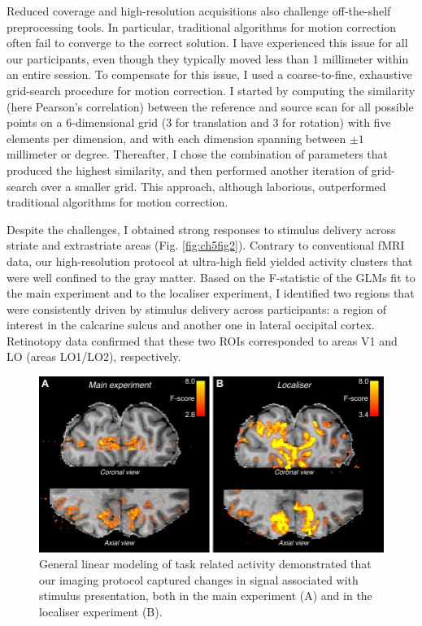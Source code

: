 Reduced coverage and high-resolution acquisitions also challenge off-the-shelf preprocessing tools. In particular, traditional algorithms for motion correction often fail to converge to the correct solution. I have experienced this issue for all our participants, even though they typically moved less than 1 millimeter within an entire session. To compensate for this issue, I used a coarse-to-fine, exhaustive grid-search procedure for motion correction. I started by computing the similarity (here Pearson's correlation) between the reference and source scan for all possible points on a 6-dimensional grid (3 for translation and 3 for rotation) with five elements per dimension, and with each dimension spanning between $\pm 1$ millimeter or degree. Thereafter, I chose the combination of parameters that produced the highest similarity, and then performed another iteration of grid-search over a smaller grid. This approach, although laborious, outperformed traditional algorithms for motion correction.

Despite the challenges, I obtained strong responses to stimulus delivery across striate and extrastriate areas (Fig. \ref{fig:ch5fig2}). Contrary to conventional fMRI data, our high-resolution protocol at ultra-high field yielded activity clusters that were well confined to the gray matter. Based on the F-statistic of the GLMs fit to the main experiment and to the localiser experiment, I identified two regions that were consistently driven by stimulus delivery across participants: a region of interest in the calcarine sulcus and another one in lateral occipital cortex. Retinotopy data confirmed that these two ROIs corresponded to areas V1 and LO (areas LO1/LO2), respectively.

\begin{figure}
  \centering
  \includegraphics[keepaspectratio]{Fig3.pdf}
  \caption[General linear modeling of stimulus related activity.]{General linear modeling of task related activity demonstrated that our imaging protocol captured changes in signal associated with stimulus presentation, both in the main experiment (A) and in the localiser experiment (B).}
  \label{fig:ch5fig3}
\end{figure}

